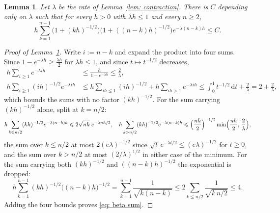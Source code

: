 \documentclass[namedate,webpdf,imanum]{ima-authoring-template}
\newcommand{\Le}{\leqslant}
\newcommand{\Ge}{\geqslant}
\newcommand{\D}{\mathrm{d}}
\theoremstyle{thmstyletwo}
\newtheorem{lemma}{Lemma}
\numberwithin{equation}{section}
\begin{document}
\begin{lemma}
\label{lem: beta sum}
    Let $\lambda$ be the rate of Lemma~\ref{lem: contraction}. There is $C$ depending only on $\lambda$ such that for every $h > 0$ with $\lambda h \Le 1$ and every $n \Ge 2$,
    \begin{equation}
        h \sum_{k=1}^{n-1} \bigl( 1 + (kh)^{-1/2} \bigr) \bigl( 1 + ((n-k)h)^{-1/2} \bigr) e^{-\lambda (n-k) h} \Le C .
        \label{eq: beta sum}
    \end{equation}
\end{lemma}
\vspace{-0.2cm}
\begin{proof}[Proof of Lemma~\ref{lem: beta sum}]
    Write $i := n - k$ and expand the product into four sums. Since $1 - e^{-\lambda h} \Ge \frac{\lambda h}{2}$ for $\lambda h \Le 1$, and since $t \mapsto t^{-1/2}$ decreases,
    \begin{align*}
        h \sum_{i \Ge 1} e^{-\lambda i h} & \Le \frac{h}{1 - e^{-\lambda h}} \Le \frac2\lambda , \\
        h \sum_{i \Ge 1} (ih)^{-1/2} e^{-\lambda i h} & \Le h \sum_{ih \Le 1} (ih)^{-1/2} + h \sum_{ih > 1} e^{-\lambda i h} \Le \int_0^1 t^{-1/2}\,\D t + \frac2\lambda = 2 + \frac2\lambda ,
    \end{align*}
    which bounds the sums with no factor $(kh)^{-1/2}$. For the sum carrying $(kh)^{-1/2}$ alone, split at $k = n/2$:
    \begin{equation*}
        h \sum_{k \Le n/2} (kh)^{-1/2} e^{-\lambda (n-k) h} \Le 2 \sqrt{nh}\; e^{-\lambda nh/2} , \quad
        h \sum_{k > n/2} (kh)^{-1/2} e^{-\lambda (n-k) h} \Le \Bigl( \frac{nh}{2} \Bigr)^{-1/2} \min\Bigl( \frac{nh}{2} ,\, \frac2\lambda \Bigr) ,
    \end{equation*}
    the sum over $k \Le n/2$ at most $2 ( e \lambda )^{-1/2}$ since $\sqrt t\, e^{-\lambda t/2} \Le ( e \lambda )^{-1/2}$ for $t \Ge 0$, and the sum over $k > n/2$ at most $( 2/\lambda )^{1/2}$ in either case of the minimum. For the sum carrying both $(kh)^{-1/2}$ and $((n-k)h)^{-1/2}$ the exponential is dropped:
    \begin{equation*}
        h \sum_{k=1}^{n-1} (kh)^{-1/2} \bigl( (n-k) h \bigr)^{-1/2} = \sum_{k=1}^{n-1} \frac{1}{\sqrt{k (n-k)}} \Le 2 \sum_{k \Le n/2} \frac{1}{\sqrt{k\, n/2}} \Le 4 .
    \end{equation*}
    Adding the four bounds proves \eqref{eq: beta sum}.
\end{proof}
\end{document}
